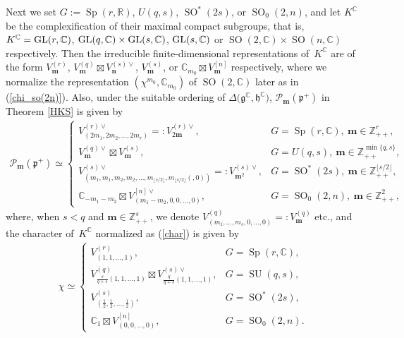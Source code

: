 \documentclass[pdftex]{sigma}
\numberwithin{equation}{section}
\newcommand{\bm}{\mathbf{m}}
\newcommand{\bn}{\mathbf{n}}
\newcommand{\BZ}{\mathbb{Z}}
\newcommand{\BR}{\mathbb{R}}
\newcommand{\BC}{\mathbb{C}}
\newcommand{\fg}{\mathfrak{g}}
\newcommand{\fh}{\mathfrak{h}}
\newcommand{\fp}{\mathfrak{p}}
\newcommand{\cP}{\mathcal{P}}
\begin{document}
Next we set $G:=\operatorname{Sp}(r,\BR)$, $U(q,s)$, $\operatorname{SO}^*(2s)$, or $\operatorname{SO}_0(2,n)$, and let $K^\BC$ be the complexification of their maximal compact subgroups,
that is, $K^\BC={\rm GL}(r,\BC)$, ${\rm GL}(q,\BC)\times {\rm GL}(s,\BC)$, ${\rm GL}(s,\BC)$ or $\operatorname{SO}(2,\BC)\times \operatorname{SO}(n,\BC)$ respectively.
Then the irreducible finite-dimensional representations of~$K^\BC$ are of the form
$V_\bm^{(r)}$, $V_\bm^{(q)}\boxtimes V_\bn^{(s)\vee}$, $V_\bm^{(s)}$, or $\BC_{m_0}\boxtimes V_\bm^{[n]}$ respectively,
where we normalize the representation $(\chi^{m_0},\BC_{m_0})$ of $\operatorname{SO}(2,\BC)$ later as in (\ref{chi_so(2n)}).
Also, under the suitable ordering of $\Delta\big(\fg^\BC,\fh^\BC\big)$, $\cP_\bm(\fp^+)$ in Theorem \ref{HKS} is given by
\begin{gather*} \cP_\bm(\fp^+)\simeq\begin{cases}
V_{(2m_1,2m_2,\ldots,2m_r)}^{(r)\vee}=:V_{2\bm}^{(r)\vee}, & G=\operatorname{Sp}(r,\BC),\ \bm\in\BZ_{++}^r,\\
V_\bm^{(q)\vee}\boxtimes V_\bm^{(s)}, & G=U(q,s),\ \bm\in\BZ_{++}^{\min\{q,s\}},\\
V_{(m_1,m_1,m_2,m_2,\ldots,m_{\lfloor s/2\rfloor},m_{\lfloor s/2\rfloor}(,0))}^{(s)\vee}=:V_{\bm^2}^{(s)\vee},
& G=\operatorname{SO}^*(2s),\ \bm\in\BZ_{++}^{\lfloor s/2\rfloor},\\
\BC_{-m_1-m_2}\boxtimes V_{(m_1-m_2,0,0,\ldots,0)}^{[n]\vee}, & G=\operatorname{SO}_0(2,n),\ \bm\in\BZ_{++}^2, \end{cases} \end{gather*}
where, when $s<q$ and $\bm\in\BZ_{++}^s$, we denote $V_{(m_1,\ldots,m_s,0,\ldots,0)}^{(q)}=:V_\bm^{(q)}$ etc.,
and the character of~$K^\BC$ normalized as (\ref{char}) is given by
\begin{gather*} \chi\simeq\begin{cases}
V_{(1,1,\ldots,1)}^{(r)}, & G=\operatorname{Sp}(r,\BC),\\
V_{\frac{s}{q+s}(1,1,\ldots,1)}^{(q)}\boxtimes V_{\frac{q}{q+s}(1,1,\ldots,1)}^{(s)\vee}, & G=\operatorname{SU}(q,s),\\
V_{\left(\frac{1}{2},\frac{1}{2},\ldots,\frac{1}{2}\right)}^{(s)}, & G=\operatorname{SO}^*(2s),\\
\BC_{1}\boxtimes V_{(0,0,\ldots,0)}^{[n]}, &G=\operatorname{SO}_0(2,n). \end{cases} \end{gather*}
\end{document}

